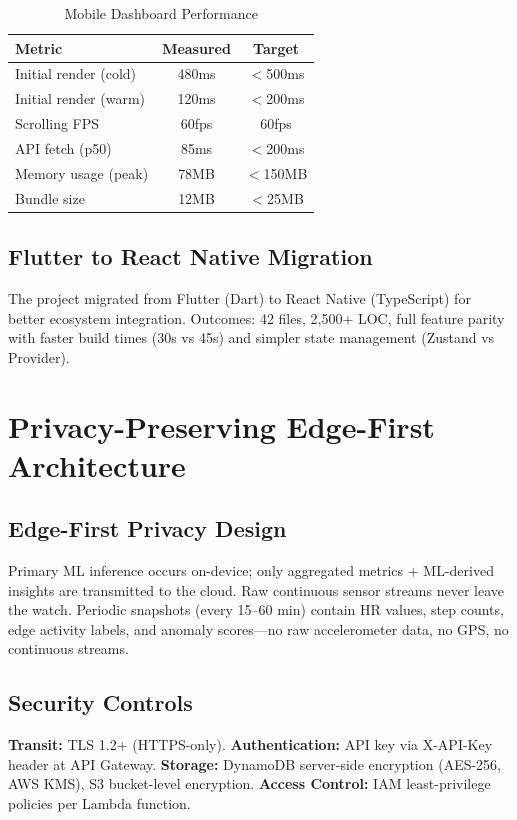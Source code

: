 \begin{table}[H]
\centering
\caption{Mobile Dashboard Performance}
\label{tab:mobile_perf}
\begin{tabular}{lcc}
\toprule
\textbf{Metric} & \textbf{Measured} & \textbf{Target} \\
\midrule
Initial render (cold) & 480ms & $<$500ms \\
Initial render (warm) & 120ms & $<$200ms \\
Scrolling FPS & 60fps & 60fps \\
API fetch (p50) & 85ms & $<$200ms \\
Memory usage (peak) & 78MB & $<$150MB \\
Bundle size & 12MB & $<$25MB \\
\bottomrule
\end{tabular}
\end{table}

\subsection{Flutter to React Native Migration}
The project migrated from Flutter (Dart) to React Native (TypeScript) for better ecosystem integration. Outcomes: 42 files, 2,500+ LOC, full feature parity with faster build times (30s vs 45s) and simpler state management (Zustand vs Provider).

\section{Privacy-Preserving Edge-First Architecture}

\subsection{Edge-First Privacy Design}
Primary ML inference occurs on-device; only aggregated metrics + ML-derived insights are transmitted to the cloud. Raw continuous sensor streams never leave the watch. Periodic snapshots (every 15--60 min) contain HR values, step counts, edge activity labels, and anomaly scores---no raw accelerometer data, no GPS, no continuous streams.

\subsection{Security Controls}
\textbf{Transit:} TLS 1.2+ (HTTPS-only). \textbf{Authentication:} API key via X-API-Key header at API Gateway. \textbf{Storage:} DynamoDB server-side encryption (AES-256, AWS KMS), S3 bucket-level encryption. \textbf{Access Control:} IAM least-privilege policies per Lambda function.

